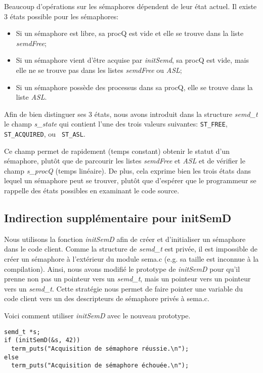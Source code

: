 \documentclass[10pt]{article}
\begin{document}
Beaucoup d'opérations sur les sémaphores dépendent de leur état
actuel.  Il existe 3 états possible pour les sémaphores:

\begin{itemize}
\item Si un sémaphore est libre, sa procQ est vide et elle se trouve
  dans la liste \emph{semdFree};
\item Si un sémaphore vient d'être acquise par \emph{initSemd}, sa
  procQ est vide, mais elle ne se trouve pas dans les listes
  \emph{semdFree} ou \emph{ASL};
\item Si un sémaphore possède des processus dans sa procQ, elle se
  trouve dans la liste \emph{ASL}.
\end{itemize}

Afin de bien distinguer ses 3 états, nous avons introduit dans la
structure \emph{semd\_t} le champ \emph{s\_state} qui contient l'une des
trois valeurs suivantes: {\tt ST\_FREE}, {\tt ST\_ACQUIRED}, ou {\tt
  ST\_ASL}.

Ce champ permet de rapidement (temps constant) obtenir le statut d'un
sémaphore, plutôt que de parcourir les listes \emph{semdFree} et
\emph{ASL} et de vérifier le champ \emph{s\_procQ} (temps linéaire).
De plus, cela exprime bien les trois états dans lequel un sémaphore
peut se trouver, plutôt que d'espérer que le programmeur se rappelle
des états possibles en examinant le code source.

\subsection{Indirection supplémentaire pour initSemD}

Nous utilisons la fonction \emph{initSemD} afin de créer et
d'initialiser un sémaphore dans le code client.  Comme la structure de
\emph{semd\_t} est privée, il est impossible de créer un sémaphore à
l'extérieur du module sema.c (e.g. sa taille est inconnue à la
compilation).  Ainsi, nous avons modifié le prototype de
\emph{initSemD} pour qu'il prenne non pas un pointeur vers un
\emph{semd\_t}, mais un pointeur vers un pointeur vers un
\emph{semd\_t}.  Cette stratégie nous permet de faire pointer une
variable du code client vers un des descripteurs de sémaphore privés à
sema.c.

Voici comment utiliser \emph{initSemD} avec le nouveau prototype.

\begin{verbatim}
semd_t *s;
if (initSemD(&s, 42))
  term_puts("Acquisition de sémaphore réussie.\n");
else
  term_puts("Acquisition de sémaphore échouée.\n");
\end{verbatim}
\end{document}

